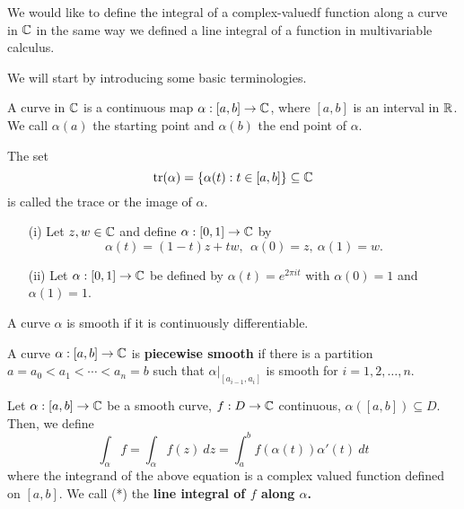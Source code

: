 \documentclass[a4paper]{article}
\begin{document}
We would like to define the integral of a complex-valuedf function along a curve in \( \mathbb{C}  \) in the same way we defined a line integral of a function in multivariable calculus.

We will start by introducing some basic terminologies.

\begin{definition}[Curve]
    A curve in \( \mathbb{C}  \) is a continuous map \( \alpha : [a,b] \to \mathbb{C}  \), where \( [a,b] \) is an interval in \( \mathbb{R}  \). We call \( \alpha(a) \) the starting point and \( \alpha(b) \) the end point of \( \alpha \).
\end{definition}

\begin{definition}
    The  set 
    \[  \text{tr}(\alpha) = \{ \alpha(t) : t \in [a,b] \} \subseteq  \mathbb{C}  \]
    is called the trace or the image of \( \alpha \).
\end{definition}

\begin{eg}
    \begin{enumerate}
        \item[(i)] Let \( z,w \in \mathbb{C}  \) and define \( \alpha: [0,1] \to \mathbb{C}  \) by 
            \[  \alpha(t) = (1-t)z + tw , \ \ \alpha(0) = z , \ \alpha(1) = w. \]
        \item[(ii)] Let \( \alpha: [0,1] \to \mathbb{C} \) be defined by \( \alpha(t) = e^{2\pi i t} \) with \( \alpha(0) = 1  \) and \( \alpha(1) = 1 \).
    \end{enumerate}
\end{eg}

\begin{definition}
    A curve \( \alpha \) is smooth if it is continuously differentiable.
\end{definition}

\begin{definition}
    A curve \( \alpha : [a,b] \to \mathbb{C}  \) is \textbf{piecewise smooth} if there is a partition \( a = {a}_{0} < {a}_{1} < \cdots < {a}_{n} = b \) such that \( \alpha |_{[{a}_{i-1}, {a}_{i}]} \) is smooth for \( i = 1 ,2, \dots , n \).
\end{definition}

\begin{definition}
    Let \( \alpha: [a,b] \to \mathbb{C}  \) be a smooth curve, \( f: D \to \mathbb{C}  \) continuous, \( \alpha([a,b]) \subseteq  D \). Then, we define 
    \[  \int_{ \alpha }^{  } f = \int_{ \alpha }^{  } f(z) \ dz = \int_{ a }^{ b } f(\alpha(t)) \alpha'(t) \ dt\tag{*} \]
    where the integrand of the above equation is a complex valued function defined on \( [a,b] \). We call (*) the \textbf{line integral of \( f  \) along \( \alpha \).}
\end{definition}
\end{document}
